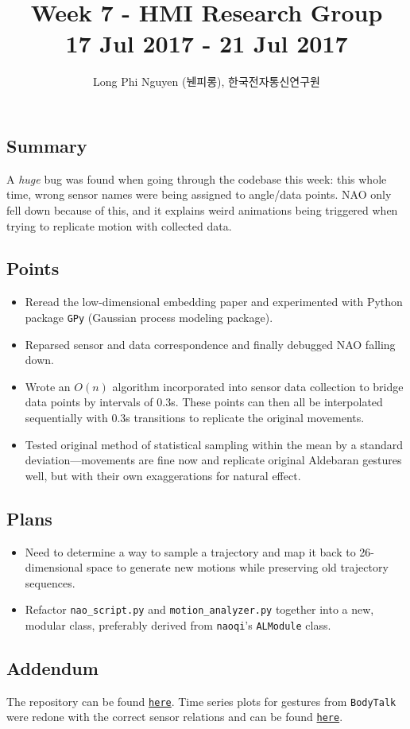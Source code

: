 \documentclass{article}
\title{Week 7 - HMI Research Group \\ \large 17 Jul 2017 - 21 Jul 2017}
\author{Long Phi Nguyen (뉀피롱), 한국전자통신연구원}
\begin{document}
  \maketitle


  \subsection*{Summary} A \emph{huge} bug was found when going through the codebase this week: this whole time, wrong sensor names were being assigned to angle/data points. NAO only fell down because of this, and it explains weird animations being triggered when trying to replicate motion with collected data.

  \subsection*{Points}
  \begin{itemize}
    \item Reread the low-dimensional embedding paper and experimented with Python package \verb|GPy| (Gaussian process modeling package).
    \item Reparsed sensor and data correspondence and finally debugged NAO falling down.
    \item Wrote an $O(n)$ algorithm incorporated into sensor data collection to bridge data points by intervals of 0.3s. These points can then all be interpolated sequentially with 0.3s transitions to replicate the original movements.
    \item Tested original method of statistical sampling within the mean by a standard deviation---movements are fine now and replicate original Aldebaran gestures well, but with their own exaggerations for natural effect.
  \end{itemize}

  \subsection*{Plans}
  \begin{itemize}
    \item Need to determine a way to sample a trajectory and map it back to 26-dimensional space to generate new motions while preserving old trajectory sequences.
    \item Refactor \verb|nao_script.py| and \verb|motion_analyzer.py| together into a new, modular class, preferably derived from \verb|naoqi|'s \verb|ALModule| class.
  \end{itemize}

  \subsection*{Addendum}
  The repository can be found \href{https://github.com/longnguyen1997/nao_animations}{\texttt{here}}.
  Time series plots for gestures from \verb|BodyTalk| were redone with the correct sensor relations and can be found
  \href{https://github.com/longnguyen1997/nao_animations/tree/master/plots/time_series/standing_bodytalk}{\texttt{here}}.
\end{document}
